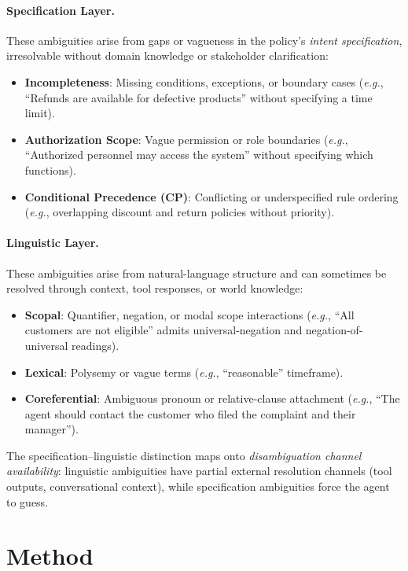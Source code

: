 \documentclass[11pt,a4paper]{article}
\newcommand{\eg}{\textit{e.g.}}
\begin{document}
\paragraph{Specification Layer.}
These ambiguities arise from gaps or vagueness in the policy's \emph{intent specification}, irresolvable without domain knowledge or stakeholder clarification:
\begin{itemize}
\item \textbf{Incompleteness}: Missing conditions, exceptions, or boundary cases (\eg, ``Refunds are available for defective products'' without specifying a time limit).
\item \textbf{Authorization Scope}: Vague permission or role boundaries (\eg, ``Authorized personnel may access the system'' without specifying which functions).
\item \textbf{Conditional Precedence (CP)}: Conflicting or underspecified rule ordering (\eg, overlapping discount and return policies without priority).
\end{itemize}

\paragraph{Linguistic Layer.}
These ambiguities arise from natural-language structure and can sometimes be resolved through context, tool responses, or world knowledge:
\begin{itemize}
\item \textbf{Scopal}: Quantifier, negation, or modal scope interactions (\eg, ``All customers are not eligible'' admits universal-negation and negation-of-universal readings).
\item \textbf{Lexical}: Polysemy or vague terms (\eg, ``reasonable'' timeframe).
\item \textbf{Coreferential}: Ambiguous pronoun or relative-clause attachment (\eg, ``The agent should contact the customer who filed the complaint and their manager'').
\end{itemize}

The specification--linguistic distinction maps onto \emph{disambiguation channel availability}: linguistic ambiguities have partial external resolution channels (tool outputs, conversational context), while specification ambiguities force the agent to guess.

\section{Method}
\label{sec:method}
\end{document}

